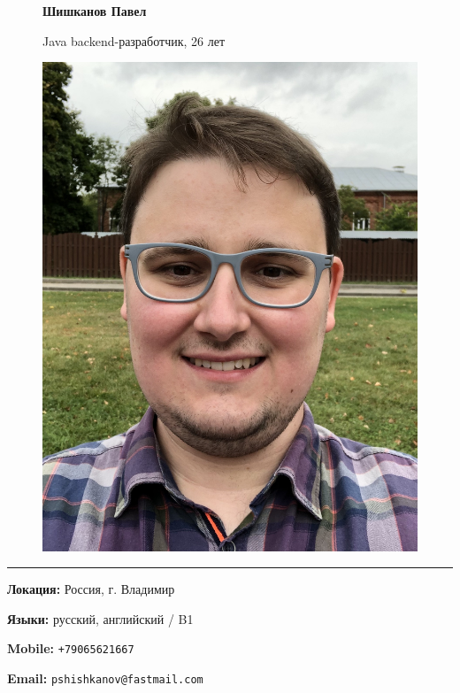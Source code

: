 \documentclass{article}
\begin{document}
\begin{figure}
	\begin{minipage}{0.48\textwidth}
		\textbf{\Large{Шишканов Павел}}

		\large{Java backend-разработчик, 26 лет}
	\end{minipage}		
	\begin{adjustbox}{minipage=11cm, right}
		\includegraphics[scale=0.05]{logo.jpeg}
	\end{adjustbox}		
\end{figure}

\noindent\rule{\textwidth}{0.5pt}

\begin{multicols}{2}

\textbf{Локация:} Россия, г. Владимир

\textbf{Языки:} русский, английский / B1

\columnbreak

\textbf{Mobile:} \texttt{+79065621667}

\textbf{Email:} \texttt{pshishkanov@fastmail.com}

\end{multicols}
\end{document}
